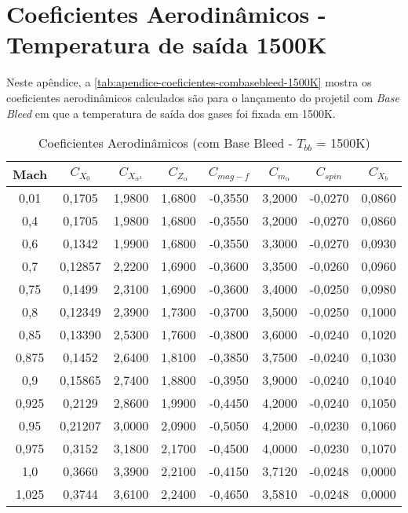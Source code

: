 \chapter{Coeficientes Aerodinâmicos - Temperatura de saída 1500K}

Neste apêndice, a \autoref{tab:apendice-coeficientes-combasebleed-1500K} mostra os coeficientes aerodinâmicos calculados são para o lançamento do projetil com \textit{Base Bleed} em que a temperatura de saída dos gases foi fixada em 1500K.

\begin{table}[ht]
\centering
\caption[Coeficientes Aerodinâmicos (com Base Bleed - $T_{bb}$ = 1500K)]{Coeficientes Aerodinâmicos (com Base Bleed - $T_{bb}$ = 1500K)}
\vspace{0.5cm}
\begin{tabular}{c|c|c|c|c|c|c|c}
Mach & $C_{X_0}$ & $C_{X_{\alpha^2}}$ & $C_{Z_\alpha}$ & $C_{mag-f}$ & $C_{m_{\alpha}}$ & $C_{spin}$ & $C_{X_b}$ \\\hline
0,01  & 0,1705  & 1,9800 & 1,6800 & -0,3550 & 3,2000 & -0,0270 & 0,0860 \\
0,4   & 0,1705  & 1,9800 & 1,6800 & -0,3550 & 3,2000 & -0,0270 & 0,0860 \\
0,6   & 0,1342  & 1,9900 & 1,6800 & -0,3550 & 3,3000 & -0,0270 & 0,0930 \\
0,7   & 0,12857 & 2,2200 & 1,6900 & -0,3600 & 3,3500 & -0,0260 & 0,0960 \\
0,75  & 0,1499  & 2,3100 & 1,6900 & -0,3600 & 3,4000 & -0,0250 & 0,0980 \\
0,8   & 0,12349 & 2,3900 & 1,7300 & -0,3700 & 3,5000 & -0,0250 & 0,1000 \\
0,85  & 0,13390 & 2,5300 & 1,7600 & -0,3800 & 3,6000 & -0,0240 & 0,1020 \\
0,875 & 0,1452  & 2,6400 & 1,8100 & -0,3850 & 3,7500 & -0,0240 & 0,1030 \\
0,9   & 0,15865 & 2,7400 & 1,8800 & -0,3950 & 3,9000 & -0,0240 & 0,1040 \\
0,925 & 0,2129  & 2,8600 & 1,9900 & -0,4450 & 4,2000 & -0,0240 & 0,1050 \\
0,95  & 0,21207 & 3,0000 & 2,0900 & -0,5050 & 4,2000 & -0,0230 & 0,1060 \\
0,975 & 0,3152  & 3,1800 & 2,1700 & -0,4500 & 4,0000 & -0,0230 & 0,1070 \\
1,0   & 0,3660  & 3,3900 & 2,2100 & -0,4150 & 3,7120 & -0,0248 & 0,0000 \\
1,025 & 0,3744  & 3,6100 & 2,2400 & -0,4650 & 3,5810 & -0,0248 & 0,0000 \\

\end{tabular}
\end{table}
